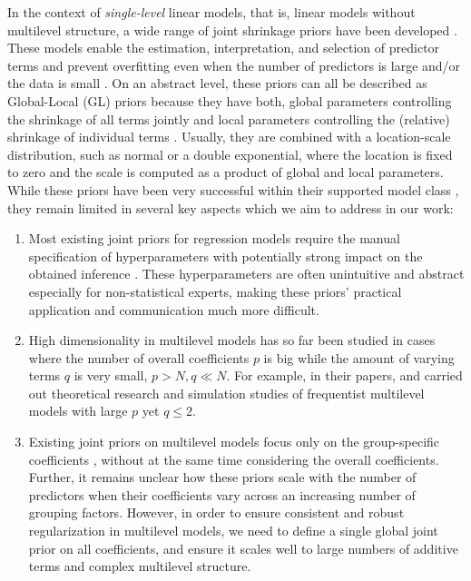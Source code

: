 In the context of \textit{single-level} linear models, that is, linear models without multilevel structure, a wide range of joint shrinkage priors have been developed \citep{bayesianlasso, Horseshoe, PiironenHorseshoe, DirichletLaplace}. These models enable the estimation, interpretation, and selection of predictor terms and prevent overfitting even when the number of predictors is large and/or the data is small \citep{BayesPenalizedRegSara, vanDP2021theoretical}. On an abstract level, these priors can all be described as Global-Local (GL) priors because they have both, global parameters controlling the shrinkage of all terms jointly and local parameters controlling the (relative) shrinkage of individual terms \citep{vanDP2021theoretical}. Usually, they are combined with a location-scale distribution, such as normal or a double exponential, where the location is fixed to zero and the scale is computed as a product of global and local parameters. While these priors have been very successful within their supported model class \citep{BayesPenalizedRegSara, vanDP2021theoretical}, they remain limited in several key aspects which we aim to address in our work:

\begin{enumerate}
    \item Most existing joint priors for regression models require the manual specification of hyperparameters with potentially strong impact on the obtained inference \citep{BayesPenalizedRegSara}. These hyperparameters are often unintuitive and abstract especially for non-statistical experts, making these priors’ practical application and communication much more difficult.
    \item High dimensionality in multilevel models has so far been studied in cases where the number of overall coefficients $p$ is big while the amount of varying terms $q$ is very small, $p > N, q \ll N$. For example, in their papers, \cite{BuehlmannBio} and \cite{LinLina} carried out theoretical research and simulation studies of frequentist multilevel models with large $p$ yet $q \leq 2$.
    \item Existing joint priors on multilevel models focus only on the group-specific coefficients \citep{Fulgstad2019, rstanarm},  without at the same time considering the overall coefficients.
    Further, it remains unclear how these priors scale with the number of predictors when their coefficients vary across an increasing number of grouping factors. However, in order to ensure consistent and robust regularization in multilevel models, we need to define a single global joint prior on all coefficients, and ensure it scales well to large numbers of additive terms and complex multilevel structure.
\end{enumerate}

